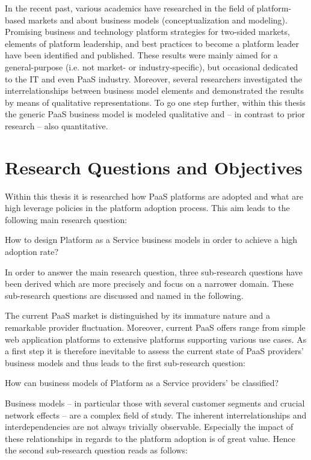 In the recent past, various academics have researched in the field of platform-based markets and about business models (conceptualization and modeling). Promising business and technology platform strategies for two-sided markets, elements of platform leadership, and best practices to become a platform leader have been identified and published. These results were mainly aimed for a general-purpose (i.e. not market- or industry-specific), but occasional dedicated to the \ac{IT} and even \ac{PaaS} industry. Moreover, several researchers investigated the interrelationships between business model elements and demonstrated the results by means of qualitative representations. To go one step further, within this thesis the generic \ac{PaaS} business model is modeled qualitative and -- in contrast to prior research -- also quantitative.

\section{Research Questions and Objectives}\label{ch:intro:rq}

Within this thesis it is researched how \ac{PaaS} platforms are adopted and what are high leverage policies in the platform adoption process. This aim leads to the following main research question:

\begin{MRQ}\label{mrq}
How to design Platform as a Service business models in order to achieve a high adoption rate?
\end{MRQ}

In order to answer the main research question, three sub-research questions have been derived which are more precisely and focus on a narrower domain. These sub-research questions are discussed and named in the following.

The current \ac{PaaS} market is distinguished by its immature nature and a remarkable provider fluctuation. Moreover, current \ac{PaaS} offers range from simple web application platforms to extensive platforms supporting various use cases. As a first step it is therefore inevitable to assess the current state of \ac{PaaS} providers' business models and thus leads to the first sub-research question:

\begin{SRQ}\label{srq1}
How can business models of Platform as a Service providers' be classified?
\end{SRQ}

Business models -- in particular those with several customer segments and crucial network effects -- are a complex field of study. The inherent interrelationships and interdependencies are not always trivially observable. Especially the impact of these relationships in regards to the platform adoption is of great value. Hence the second sub-research question reads as follows:

